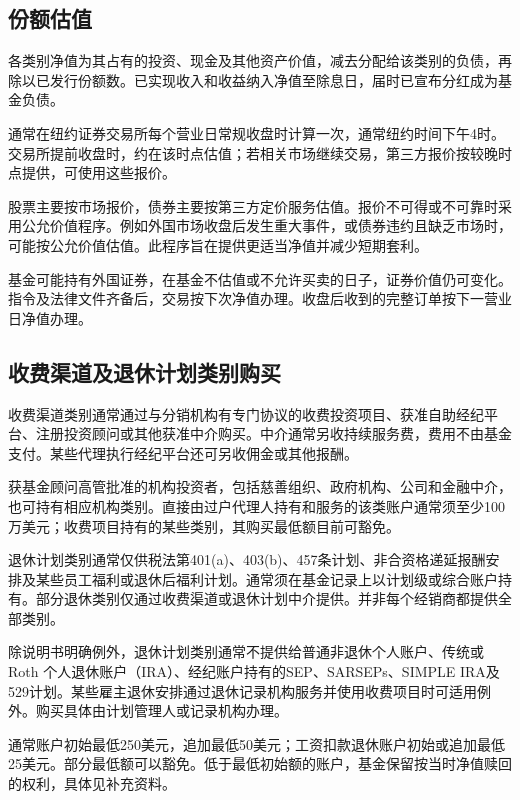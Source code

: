 \documentclass[UTF8,fontset=none,11pt,a4paper]{ctexart}
\begin{document}
\subsection*{份额估值}
各类别净值为其占有的投资、现金及其他资产价值，减去分配给该类别的负债，再除以已发行份额数。已实现收入和收益纳入净值至除息日，届时已宣布分红成为\allowbreak\mbox{基金负债。}


通常在纽约证券交易所每个营业日常规收盘时计算一次，通常纽约时间下午4时。交易所提前收盘时，约在该时点估值；若相关市场继续交易，第三方报价按较晚时点提供，可使用\allowbreak\mbox{这些报价。}


股票主要按市场报价，债券主要按第三方定价服务估值。报价不可得或不可靠时采用公允价值程序。例如外国市场收盘后发生重大事件，或债券违约且缺乏市场时，可能按公允价值估值。此程序旨在提供更适当净值并减少\allowbreak\mbox{短期套利。}


基金可能持有外国证券，在基金不估值或不允许买卖的日子，证券价值仍可变化。指令及法律文件齐备后，交易按下次净值办理。收盘后收到的完整订单按下一营业日\allowbreak\mbox{净值办理。}


\subsection*{收费渠道及退休计划类别购买}
收费渠道类别通常通过与分销机构有专门协议的收费投资项目、获准自助经纪平台、注册投资顾问或其他获准中介购买。中介通常另收持续服务费，费用不由基金支付。某些代理执行经纪平台还可另收佣金或\allowbreak\mbox{其他报酬。}


获基金顾问高管批准的机构投资者，包括慈善组织、政府机构、公司和金融中介，也可持有相应机构类别。直接由过户代理人持有和服务的该类账户通常须至少100万美元；收费项目持有的某些类别，其购买最低额目\allowbreak\mbox{前可豁免。}


退休计划类别通常仅供税法第401(a)、403(b)、457条计划、非合资格递延报酬安排及某些员工福利或退休后福利计划。通常须在基金记录上以计划级或综合账户持有。部分退休类别仅通过收费渠道或退休计划中介提供。并非每个经销商都提供\allowbreak\mbox{全部类别。}


除说明书明确例外，退休计划类别通常不提供给普通非退休个人账户、传统或Roth 个人退休账户（IRA）、经纪账户持有的SEP、SARSEPs、SIMPLE IRA及529计划。某些雇主退休安排通过退休记录机构服务并使用收费项目时可适用例外。购买具体由计划管理人或记录机\allowbreak\mbox{构办理。}


通常账户初始最低250美元，追加最低50美元；工资扣款退休账户初始或追加最低25美元。部分最低额可以豁免。低于最低初始额的账户，基金保留按当时净值赎回的权利，具体见\allowbreak\mbox{补充资料。}
\end{document}
